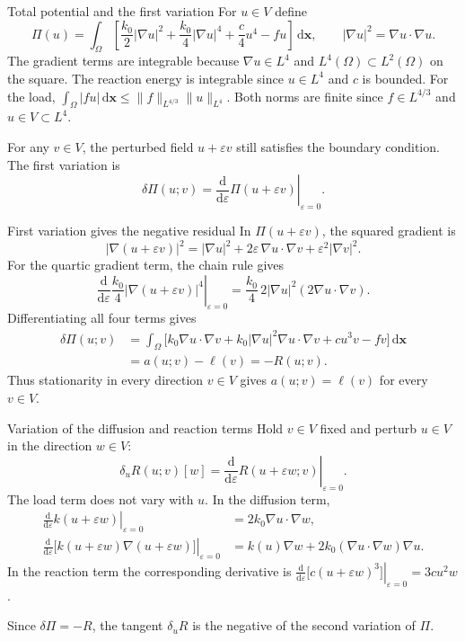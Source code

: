 \documentclass[11pt,aspectratio=169]{beamer}
\newcommand{\bx}{\bm x}
\newcommand{\dd}{\mathrm d}
\begin{document}
\begin{frame}{Total potential and the first variation}
For $u\in V$ define
\[
\Pi(u)=\int_\Omega\left[
\frac{k_0}{2}|\nabla u|^2+\frac{k_0}{4}|\nabla u|^4
+\frac{c}{4}u^4-fu
\right]\,\dd\bx,\qquad |\nabla u|^2=\nabla u\cdot\nabla u.
\]
The gradient terms are integrable because $\nabla u\in L^4$ and
$L^4(\Omega)\subset L^2(\Omega)$ on the square.
The reaction energy is integrable since $u\in L^4$ and $c$ is bounded.
For the load, $\int_\Omega |fu|\,\dd\bx\le \|f\|_{L^{4/3}}\|u\|_{L^4}$.
Both norms are finite since $f\in L^{4/3}$ and $u\in V\subset L^4$.

\medskip
For any $v\in V$, the perturbed field $u+\varepsilon v$ still satisfies
the boundary condition. The first variation is
\[
\delta\Pi(u;v)=
\left.\frac{\dd}{\dd\varepsilon}\Pi(u+\varepsilon v)\right|_{\varepsilon=0}.
\]
\end{frame}

\begin{frame}{First variation gives the negative residual}
In $\Pi(u+\varepsilon v)$, the squared gradient is
\[
|\nabla(u+\varepsilon v)|^2
=|\nabla u|^2+2\varepsilon\,\nabla u\cdot\nabla v
+\varepsilon^2|\nabla v|^2 .
\]
For the quartic gradient term, the chain rule gives
\[
\left.\frac{\dd}{\dd\varepsilon}
\frac{k_0}{4}|\nabla(u+\varepsilon v)|^4\right|_{\varepsilon=0}
=\frac{k_0}{4}\,2|\nabla u|^2(2\nabla u\cdot\nabla v).
\]
Differentiating all four terms gives
\[
\begin{aligned}
\delta\Pi(u;v)
&=\int_\Omega\bigl[k_0\nabla u\cdot\nabla v
+k_0|\nabla u|^2\nabla u\cdot\nabla v+cu^3v-fv\bigr]\,\dd\bx\\
&=a(u;v)-\ell(v)=-R(u;v).
\end{aligned}
\]
Thus stationarity in every direction $v\in V$ gives
$a(u;v)=\ell(v)$ for every $v\in V$.
\end{frame}

\begin{frame}{Variation of the diffusion and reaction terms}
Hold $v\in V$ fixed and perturb $u\in V$ in the direction $w\in V$:
\[
\delta_u R(u;v)[w]=
\left.\frac{\dd}{\dd\varepsilon}R(u+\varepsilon w;v)\right|_{\varepsilon=0}.
\]
The load term does not vary with $u$. In the diffusion term,
\[
\begin{aligned}
\left.\frac{\dd}{\dd\varepsilon}k(u+\varepsilon w)\right|_{\varepsilon=0}
  &=2k_0\nabla u\cdot\nabla w,\\
\left.\frac{\dd}{\dd\varepsilon}\bigl[k(u+\varepsilon w)\nabla(u+\varepsilon w)\bigr]\right|_{\varepsilon=0}
  &=k(u)\nabla w+2k_0(\nabla u\cdot\nabla w)\nabla u .
\end{aligned}
\]
In the reaction term the corresponding derivative is
$\left.\frac{\dd}{\dd\varepsilon}\bigl[c(u+\varepsilon w)^3\bigr]\right|_{\varepsilon=0}=3cu^2w$.

Since $\delta\Pi=-R$, the tangent $\delta_uR$ is the negative of the second variation of $\Pi$.
\end{frame}
\end{document}
